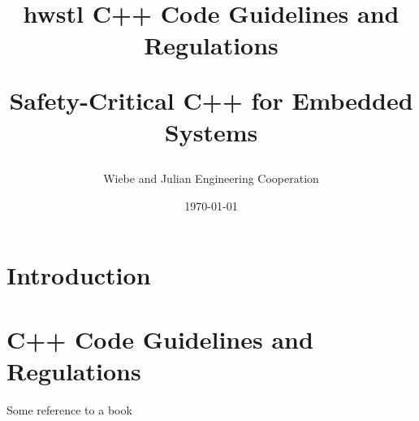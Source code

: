 \documentclass[11pt]{article}
\title{
      hwstl C++ Code Guidelines and Regulations \\
      \begin{large}
         Safety-Critical C++ for Embedded Systems
      \end{large}
}
\date{\today}
\author{Wiebe and Julian Engineering Cooperation}
\begin{document}
\maketitle

\newpage
{} %
\tableofcontents
\newpage
{} %

\newpage
\section{Introduction}

\section{C++ Code Guidelines and Regulations}
Some reference to a book \cite{DUMMY:1}

\newpage
\printbibliography

\newpage
\begin{appendix}
\end{appendix}
\end{document}
